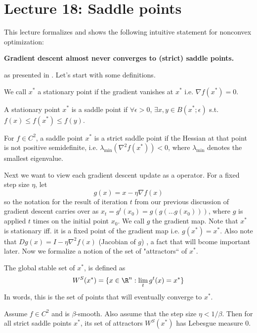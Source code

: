 \section{Lecture 18: Saddle points} 

This lecture formalizes and shows the following intuitive statement for nonconvex optimization:
\begin{center}
	\textbf{Gradient descent almost never converges to (strict) saddle points.}
\end{center}
as presented in \cite{lee2016gradient}. Let's start with some definitions.

\begin{definition}
We call $x^*$ a stationary point if the gradient vanishes at $x^*$ i.e. $\nabla f(x^*) = 0$. 
\end{definition}

\begin{definition}
A stationary point $x^*$ is a saddle point if $\forall \epsilon>0$,  $\exists x,y \in B(x^*;\epsilon)$ s.t. \\
$f(x)\leq f(x^*)\leq f(y)$.
\end{definition}

\begin{definition}
For $f\in C^2$, a saddle point $x^*$ is a strict saddle point if the Hessian at that point is not positive semidefinite, i.e.
$\lambda_{\text{min}}(\nabla^2 f(x^*)) < 0$,
where $\lambda_{\text{min}}$ denotes the smallest eigenvalue.
\end{definition}

Next we want to view each gradient descent update as a operator.  
For a fixed step size $\eta$, let
$$
g(x) = x-\eta\nabla f(x)
$$ 
so the notation for the result of iteration $t$ from our previous discussion of gradient descent carries over as $x_t = g^t(x_0) = g(g(...g(x_0)))$, where $g$ is applied $t$ times on the initial point $x_0$. We call $g$ the gradient map. Note that $x^*$ is stationary iff. it is a fixed point of the gradient map i.e. $g(x^*) = x^*$. Also note that
$D g(x) = I - \eta\nabla^2 f(x)$ (Jacobian of $g$) , a fact that will bcome important later. Now we formalize a notion of the set of "attractors`` of $x^*$.
\begin{definition}
The global stable set of $x^*$, is defined as
$$
W^S(x^*) = \{ x\in\R^n: \lim_{t} g^t(x) = x^* \}
$$
In words, this is the set of points that will eventually converge to $x^*$.
\end{definition}

\begin{theorem}
Assume $f\in C^2$ and is $\beta$-smooth. Also assume that the step size $\eta < 1/\beta$. Then for all strict saddle points $x^*$, its set of attractors $W^S(x^*)$ has Lebesgue measure 0.
\end{theorem}

